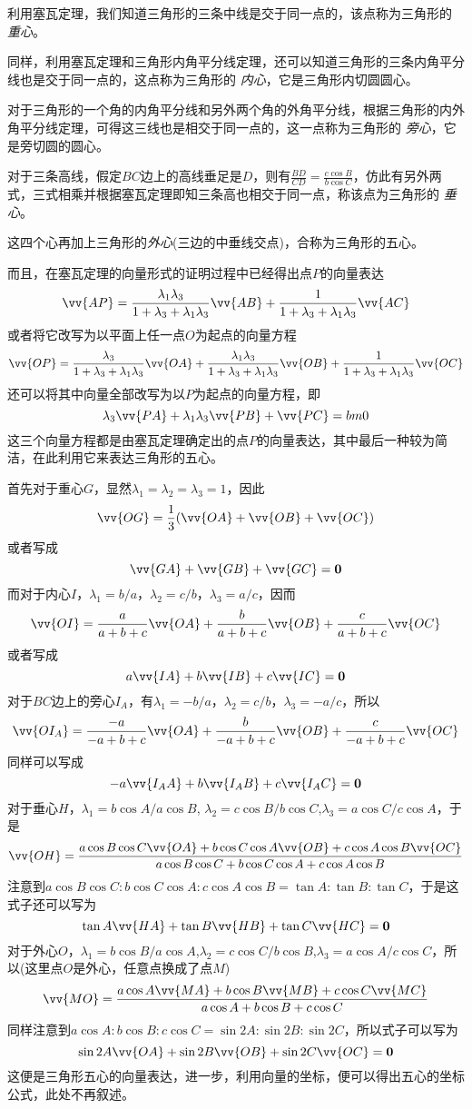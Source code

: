 \begin{example}[三角形的几个心及其向量表达]
 利用塞瓦定理，我们知道三角形的三条中线是交于同一点的，该点称为三角形的 \emph{重心}。

 同样，利用塞瓦定理和三角形内角平分线定理，还可以知道三角形的三条内角平分线也是交于同一点的，这点称为三角形的 \emph{内心}，它是三角形内切圆圆心。

 对于三角形的一个角的内角平分线和另外两个角的外角平分线，根据三角形的内外角平分线定理，可得这三线也是相交于同一点的，这一点称为三角形的 \emph{旁心}，它是旁切圆的圆心。

 对于三条高线，假定$BC$边上的高线垂足是$D$，则有$\frac{BD}{CD}=\frac{c \cos{B}}{b \cos{C}}$，仿此有另外两式，三式相乘并根据塞瓦定理即知三条高也相交于同一点，称该点为三角形的 \emph{垂心}。

这四个心再加上三角形的\emph{外心}(三边的中垂线交点)，合称为三角形的五心。 

而且，在塞瓦定理的向量形式的证明过程中已经得出点$P$的向量表达
 \[ \vv{AP} = \frac{\lambda_1\lambda_3}{1+\lambda_3+\lambda_1\lambda_3} \vv{AB} + \frac{1}{1+\lambda_3+\lambda_1\lambda_3} \vv{AC} \]
 或者将它改写为以平面上任一点$O$为起点的向量方程
 \[ \vv{OP} = \frac{\lambda_3}{1+\lambda_3+\lambda_1\lambda_3} \vv{OA} + \frac{\lambda_1\lambda_3}{1+\lambda_3+\lambda_1\lambda_3} \vv{OB} + \frac{1}{1+\lambda_3+\lambda_1\lambda_3} \vv{OC} \]
 还可以将其中向量全部改写为以$P$为起点的向量方程，即
 \[ \lambda_3 \vv{PA} + \lambda_1 \lambda_3 \vv{PB} + \vv{PC} = bm{0} \]
 这三个向量方程都是由塞瓦定理确定出的点$P$的向量表达，其中最后一种较为简洁，在此利用它来表达三角形的五心。

 首先对于重心$G$，显然$\lambda_1=\lambda_2=\lambda_3=1$，因此
 \[ \vv{OG} = \frac{1}{3} (\vv{OA} + \vv{OB} + \vv{OC}) \]
 或者写成
 \[ \vv{GA} + \vv{GB} + \vv{GC} = \bm{0} \]
 而对于内心$I$，$\lambda_1 = b/a$，$\lambda_2=c/b$，$\lambda_3=a/c$，因而
 \[ \vv{OI} = \frac{a}{a+b+c} \vv{OA} + \frac{b}{a+b+c} \vv{OB} + \frac{c}{a+b+c} \vv{OC} \]
 或者写成
 \[ a\vv{IA} + b \vv{IB} + c\vv{IC} = \bm{0} \]
 对于$BC$边上的旁心$I_A$，有$\lambda_1=-b/a$，$\lambda_2=c/b$，$\lambda_3=-a/c$，所以
 \[ \vv{OI_A} = \frac{-a}{-a+b+c} \vv{OA} + \frac{b}{-a+b+c} \vv{OB} + \frac{c}{-a+b+c} \vv{OC} \]
 同样可以写成
 \[ -a \vv{I_AA} + b \vv{I_AB} + c\vv{I_AC} = \bm{0} \]
 对于垂心$H$，$\lambda_1=b\cos{A}/a\cos{B}$, $\lambda_2=c\cos{B}/b\cos{C}$,$\lambda_3=a\cos{C}/c\cos{A}$，于是
 \[ \vv{OH} = \frac{a \cos{B}\cos{C} \vv{OA} + b \cos{C}\cos{A} \vv{OB} + c \cos{A}\cos{B} \vv{OC}}{a\cos{B}\cos{C}+b\cos{C}\cos{A}+c\cos{A}\cos{B}} \]
 注意到$a \cos{B}\cos{C} : b \cos{C}\cos{A} : c \cos{A}\cos{B} = \tan{A} : \tan{B} : \tan{C}$，于是这式子还可以写为
 \[ \tan{A} \vv{HA} + \tan{B} \vv{HB} + \tan{C} \vv{HC} = \bm{0} \]
 对于外心$O$，$\lambda_1=b\cos{B}/a\cos{A}$,$\lambda_2=c\cos{C}/b\cos{B}$,$\lambda_3=a\cos{A}/c\cos{C}$，所以(这里点$O$是外心，任意点换成了点$M$)
 \[ \vv{MO} = \frac{a\cos{A}\vv{MA}+b\cos{B}\vv{MB}+c\cos{C}\vv{MC}}{a\cos{A}+b\cos{B}+c\cos{C}} \]
 同样注意到$a\cos{A} : b\cos{B} : c\cos{C} = \sin{2A} : \sin{2B} : \sin{2C}$，所以式子可以写为
 \[ \sin{2A} \vv{OA} + \sin{2B} \vv{OB} + \sin{2C} \vv{OC} = \bm{0} \]
 这便是三角形五心的向量表达，进一步，利用向量的坐标，便可以得出五心的坐标公式，此处不再叙述。
\end{example}

